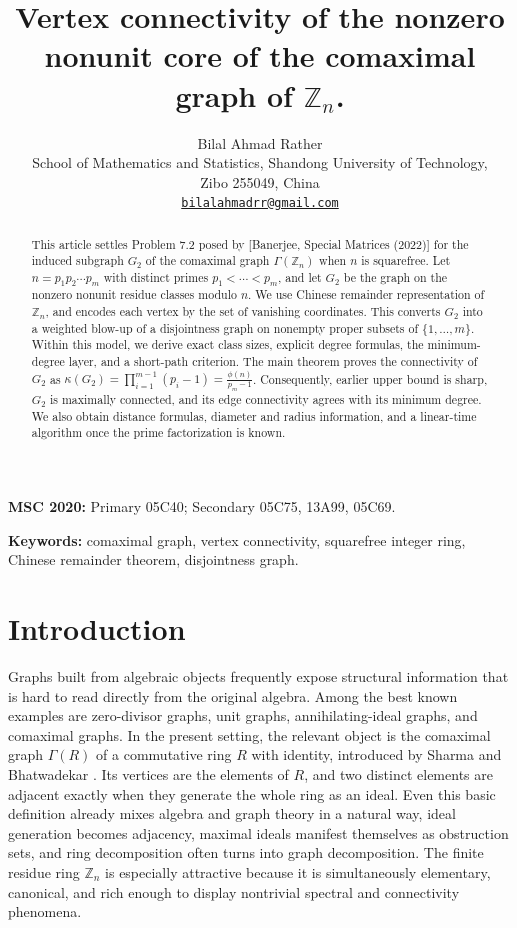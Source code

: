\documentclass[12pt]{article}
\title{Vertex connectivity of the nonzero nonunit core of the comaximal graph of $\mathbb Z_n$.}
\author{Bilal Ahmad Rather\\[2mm]
	\small School of Mathematics and Statistics, Shandong University of Technology,\\
	\small Zibo 255049, China\\
	\texttt{\href{mailto:bilalahmadrr@gmail.com}{bilalahmadrr@gmail.com}}
}
\date{}
\theoremstyle{definition}
\begin{document}
	
	\maketitle
	\pagestyle{myheadings}
	
	\begin{abstract}
		This article settles Problem 7.2 posed by [Banerjee, Special Matrices (2022)] for the induced subgraph $G_2$ of the comaximal graph $\Gamma(\mathbb Z_n)$ when $n$ is squarefree. Let $n=p_1p_2\cdots p_m$ with distinct primes $p_1<\cdots<p_m$, and let $G_2$ be the graph on the nonzero nonunit residue classes modulo $n$. We use Chinese remainder representation of $\mathbb Z_n$, and encodes each vertex by the set of vanishing coordinates. This converts $G_2$ into a weighted blow-up of a disjointness graph on nonempty proper subsets of $\{1,\dots,m\}$. Within this model, we derive exact class sizes, explicit degree formulas, the minimum-degree layer, and a short-path criterion. The main theorem proves the connectivity of $G_{2}$ as  $\kappa(G_2)=\prod_{i=1}^{m-1}(p_i-1)=\tfrac{\phi(n)}{p_m-1}$. Consequently, earlier upper bound is sharp, $G_2$ is maximally connected, and its edge connectivity agrees with its minimum degree. We also obtain distance formulas, diameter and radius information, and a linear-time algorithm once the prime factorization is known.
	\end{abstract}
	
	\noindent \textbf{MSC 2020:} Primary 05C40; Secondary 05C75, 13A99, 05C69.
	
	\noindent \textbf{Keywords:} comaximal graph, vertex connectivity, squarefree integer ring, Chinese remainder theorem, disjointness graph.
	
	\section{Introduction}\label{sec:intro}
	
	Graphs built from algebraic objects frequently expose structural information that is hard to read directly from the original algebra. Among the best known examples are zero-divisor graphs, unit graphs, annihilating-ideal graphs, and comaximal graphs. In the present setting, the relevant object is the comaximal graph $\Gamma(R)$ of a commutative ring $R$ with identity, introduced by Sharma and Bhatwadekar \cite{SharmaBhatwadekar1995}. Its vertices are the elements of $R$, and two distinct elements are adjacent exactly when they generate the whole ring as an ideal. Even this basic definition already mixes algebra and graph theory in a natural way, ideal generation becomes adjacency, maximal ideals manifest themselves as obstruction sets, and ring decomposition often turns into graph decomposition. The finite residue ring $\mathbb Z_n$ is especially attractive because it is simultaneously elementary, canonical, and rich enough to display nontrivial spectral and connectivity phenomena.
	
\end{document}
